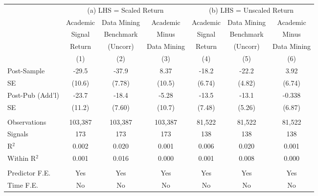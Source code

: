 \begingroup
\setlength{\tabcolsep}{0.55ex}%
\centering
\begin{tabular}{lcccccc}
   \toprule
                    & \multicolumn{3}{c}{(a) LHS = Scaled Return} & \multicolumn{3}{c}{(b) LHS = Unscaled Return} \\
   \cmidrule(lr){2-4}\cmidrule(lr){5-7}
                    & Academic
                    & Data Mining
                    & Academic
                    & Academic
                    & Data Mining
                    & Academic \\
                    & Signal
                    & Benchmark
                    & Minus
                    & Signal
                    & Benchmark
                    & Minus \\
                    & Return
                    & (Uncorr)
                    & Data Mining
                    & Return
                    & (Uncorr)
                    & Data Mining \\
                    & (1) & (2) & (3) & (4) & (5) & (6) \\
   \midrule
   Post-Sample      & -29.5 & -37.9 & 8.37 & -18.2 & -22.2 & 3.92 \\
   SE               & (10.6) & (7.78) & (10.5) & (6.74) & (4.82) & (6.74) \\
   Post-Pub (Add'l) & -23.7 & -18.4 & -5.28 & -13.5 & -13.1 & -0.338 \\
   SE               & (11.2) & (7.60) & (10.7) & (7.48) & (5.26) & (6.87) \\
   \\
   Observations     & 103,387 & 103,387 & 103,387 & 81,522 & 81,522 & 81,522 \\
   Signals          & 173 & 173 & 173 & 138 & 138 & 138 \\
   R$^2$            & 0.002 & 0.020 & 0.001 & 0.006 & 0.020 & 0.001 \\
   Within R$^2$     & 0.001 & 0.016 & 0.000 & 0.001 & 0.008 & 0.000 \\
   \\
   Predictor F.E.   & Yes & Yes & Yes & Yes & Yes & Yes \\
   Time F.E.        & No & No & No & No & No & No \\
   \bottomrule
\end{tabular}
\par\endgroup
